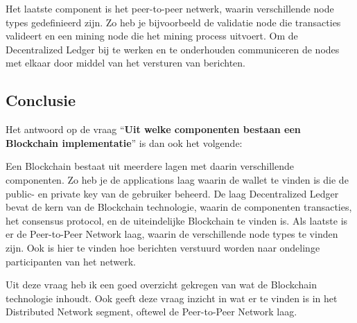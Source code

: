 Het laatste component is het peer-to-peer netwerk, waarin verschillende node types gedefinieerd zijn. Zo heb je bijvoorbeeld de validatie node die transacties valideert en een mining node die het mining process uitvoert. Om de Decentralized Ledger bij te werken en te onderhouden communiceren de nodes met elkaar door middel van het versturen van berichten.

\subsection{Conclusie}

Het antwoord op de vraag ``\textbf{Uit welke componenten bestaan een Blockchain implementatie}'' is dan ook het volgende:

Een Blockchain bestaat uit meerdere lagen met daarin verschillende componenten. Zo heb je de applications laag waarin de wallet te vinden is die de public- en private key van de gebruiker beheerd. De laag Decentralized Ledger bevat de kern van de Blockchain technologie, waarin de componenten transacties, het consensus protocol, en de uiteindelijke Blockchain te vinden is. Als laatste is er de Peer-to-Peer Network laag, waarin de verschillende node types te vinden zijn. Ook is hier te vinden hoe berichten verstuurd worden naar ondelinge participanten van het netwerk.

Uit deze vraag heb ik een goed overzicht gekregen van wat de Blockchain technologie inhoudt. Ook geeft deze vraag inzicht in wat er te vinden is in het Distributed Network segment, oftewel de Peer-to-Peer Network laag.

